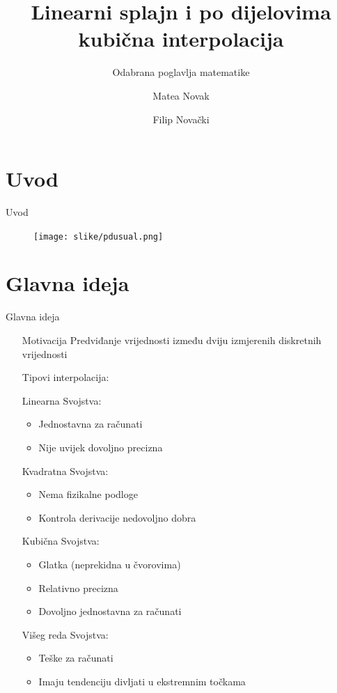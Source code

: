 \documentclass[10pt]{beamer}
\begin{document}
	\author{Matea Novak \and Filip Novački}
	\title{Linearni splajn i po dijelovima kubična interpolacija}
	\subtitle{Odabrana poglavlja matematike}
	\institute{}

	\begin{frame}[plain]
	\maketitle
\end{frame}
\tableofcontents
\section{Uvod}
\begin{frame}{Uvod}
	\begin{figure}
		\centering
		\texttt{[image: slike/pdusual.png]}
	\end{figure}
\end{frame}
\section{Glavna ideja}
	\begin{frame}{Glavna ideja}
		\begin{itemize}
			\item[Motivacija ] Predviđanje vrijednosti između dviju izmjerenih diskretnih vrijednosti
			\pause
			\item[Tipovi interpolacija: ] 
			\item[Linearna ] Svojstva:
			\begin{itemize}
				\item Jednostavna za računati
				\item Nije uvijek dovoljno precizna
			\end{itemize}
		
			\item[Kvadratna ] Svojstva:
			\begin{itemize}
				\item Nema fizikalne podloge
				\item Kontrola derivacije nedovoljno dobra
			\end{itemize}
			\item[Kubična ] Svojstva:
			\begin{itemize}
				\item Glatka (neprekidna u čvorovima)
				\item Relativno precizna
				\item Dovoljno jednostavna za računati
			\end{itemize}
			\item[Višeg reda ] Svojstva:
			\begin{itemize}
				\item Teške za računati
				\item Imaju tendenciju divljati u ekstremnim točkama
			\end{itemize}
		\end{itemize}
	\end{frame}
\end{document}
